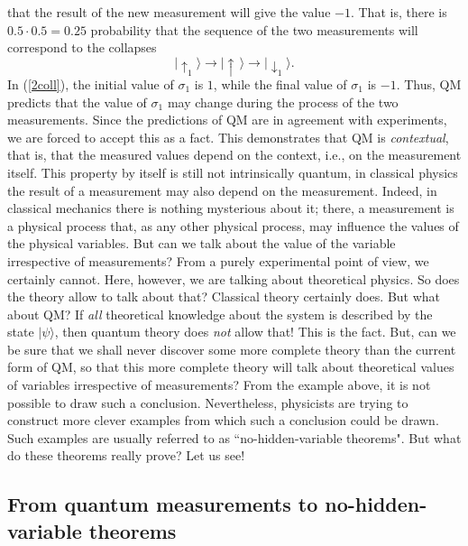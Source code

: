 \documentclass[12pt]{article}
\begin{document}
that the result of the new measurement will give the value $-1$.
That is, there is $0.5\cdot 0.5=0.25$ probability that the sequence of the two 
measurements will correspond to the collapses
\begin{equation}\label{2coll}
|\!\uparrow_1\rangle \rightarrow |\!\uparrow\,\rangle \rightarrow
|\!\downarrow_1\rangle .
\end{equation}
In (\ref{2coll}), the initial value of $\sigma_1$ is $1$, while the 
final value of $\sigma_1$ is $-1$. Thus, QM predicts that the value of 
$\sigma_1$ may change during the process of the two measurements.
Since the predictions of QM are in agreement with experiments, 
we are forced to accept this as a fact. This demonstrates that 
QM is {\em contextual}, that is, that the measured values depend on the 
context, i.e., on the measurement itself. This property 
by itself is still not intrinsically quantum, in classical physics 
the result of a measurement may also depend on the measurement.
Indeed, in classical mechanics there is nothing mysterious about it;
there, a measurement is a physical process that, as any other physical 
process, may influence the values of the physical variables. But 
can we talk about the value of the variable irrespective of 
measurements? From a purely experimental point of view, we certainly cannot.
Here, however, we are talking about theoretical physics. 
So does the theory allow to talk about that? Classical theory 
certainly does. But what about QM? If {\em all} theoretical knowledge 
about the system is described by the state $|\psi\rangle$, 
then quantum theory does {\em not} allow that! This is the fact. 
But, can we be sure that we shall never discover some more complete theory 
than the current form of QM, so that this more complete theory 
will talk about theoretical values of variables irrespective of 
measurements? From the example above, it is not possible to
draw such a conclusion. Nevertheless, physicists are trying 
to construct more clever examples from which such a conclusion 
could be drawn. Such examples are usually referred to as 
``no-hidden-variable theorems". But what do these theorems 
really prove? Let us see!     

\subsection{From quantum measurements to no-hidden-variable 
theorems}
\end{document}
